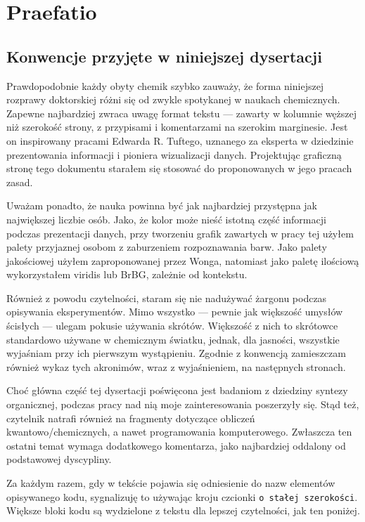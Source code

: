 \chapter{Praefatio}
\section{Konwencje przyjęte w niniejszej dysertacji}

Prawdopodobnie każdy obyty chemik szybko zauważy, że forma niniejszej rozprawy doktorskiej różni się od zwykle spotykanej w naukach chemicznych.
Zapewne najbardziej zwraca uwagę format tekstu --- zawarty w kolumnie węższej niż szerokość strony, z przypisami i komentarzami na szerokim marginesie.
Jest on inspirowany pracami\cite{Tufte2001,Tufte1990,Tufte1997,Tufte2006} Edwarda R. Tuftego,
uznanego za eksperta w dziedzinie prezentowania informacji i pioniera wizualizacji danych\cite{Yaffa2011}.
Projektując graficzną stronę tego dokumentu starałem się stosować do proponowanych w jego pracach zasad.

Uważam ponadto, że nauka powinna być jak najbardziej przystępna jak największej liczbie osób.
Jako, że kolor może nieść istotną część informacji podczas prezentacji danych,
przy tworzeniu grafik zawartych w pracy tej użyłem palety przyjaznej osobom z zaburzeniem rozpoznawania barw.
Jako palety jakościowej użyłem zaproponowanej przez Wonga\cite{wong11},
natomiast jako paletę ilościową wykorzystałem viridis\cite{Smith2015} lub BrBG, zależnie od kontekstu.

Również z powodu czytelności, staram się nie nadużywać żargonu podczas opisywania eksperymentów.
Mimo wszystko --- pewnie jak większość umysłów ścisłych --- ulegam pokusie używania skrótów.
Większość z nich to skrótowce standardowo używane w chemicznym światku,
jednak, dla jasności, wszystkie wyjaśniam przy ich pierwszym wystąpieniu.
Zgodnie z konwencją zamieszczam również wykaz tych akronimów, wraz z wyjaśnieniem, na następnych stronach.

Choć główna część tej dysertacji poświęcona jest badaniom z dziedziny syntezy organicznej,
podczas pracy nad nią moje zainteresowania poszerzyły się.
Stąd też, czytelnik natrafi również na fragmenty dotyczące obliczeń kwantowo\-/chemicznych, a nawet programowania komputerowego.
Zwłaszcza ten ostatni temat wymaga dodatkowego komentarza, jako najbardziej oddalony od podstawowej dyscypliny.

Za każdym razem, gdy w tekście pojawia się odniesienie do nazw elementów opisywanego kodu,
sygnalizuję to używając kroju czcionki \verb!o stałej szerokości!.
Większe bloki kodu są wydzielone z tekstu dla lepszej czytelności, jak ten poniżej.

